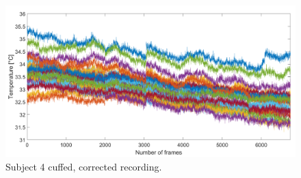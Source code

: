 \begin{figure}[htbp]
\begin{minipage}[b]{0.45\linewidth}
	\end{minipage}
	\hspace{0.2cm}
	\begin{minipage}[b]{0.45\linewidth}
		\centering
		\includegraphics[width=\linewidth]{figures/Recordings/Sub4_cuffed_corr}
		\caption{Subject 4 cuffed, corrected recording.}
	
	\end{minipage}
\end{figure}